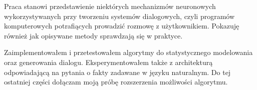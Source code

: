 
Praca stanowi przedstawienie niektórych mechanizmów neuronowych wykorzystywanych przy tworzeniu systemów dialogowych, czyli programów komputerowych potrafiących prowadzić rozmowę z użytkownikiem. Pokazuję również jak opisywane metody sprawdzają się w praktyce.

Zaimplementowałem i przetestowałem algorytmy do statystycznego modelowania oraz generowania dialogu. Eksperymentowałem także z architekturą odpowiadającą na pytania o fakty zadawane w języku naturalnym. Do tej ostatniej części dołączam moją próbę rozszerzenia możliwości algorytmu.

